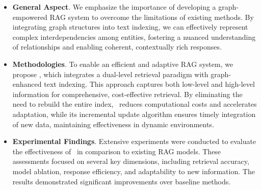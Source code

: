 \begin{itemize}[leftmargin=*]

\item \textbf{General Aspect}. We emphasize the importance of developing a graph-empowered RAG system to overcome the limitations of existing methods. By integrating graph structures into text indexing, we can effectively represent complex interdependencies among entities, fostering a nuanced understanding of relationships and enabling coherent, contextually rich responses.

\item \textbf{Methodologies}. To enable an efficient and adaptive RAG system, we propose \model, which integrates a dual-level retrieval paradigm with graph-enhanced text indexing. This approach captures both low-level and high-level information for comprehensive, cost-effective retrieval. By eliminating the need to rebuild the entire index, \model\ reduces computational costs and accelerates adaptation, while its incremental update algorithm ensures timely integration of new data, maintaining effectiveness in dynamic environments.

\item \textbf{Experimental Findings}. Extensive experiments were conducted to evaluate the effectiveness of \model\ in comparison to existing RAG models. These assessments focused on several key dimensions, including retrieval accuracy, model ablation, response efficiency, and adaptability to new information. The results demonstrated significant improvements over baseline methods.

\end{itemize}